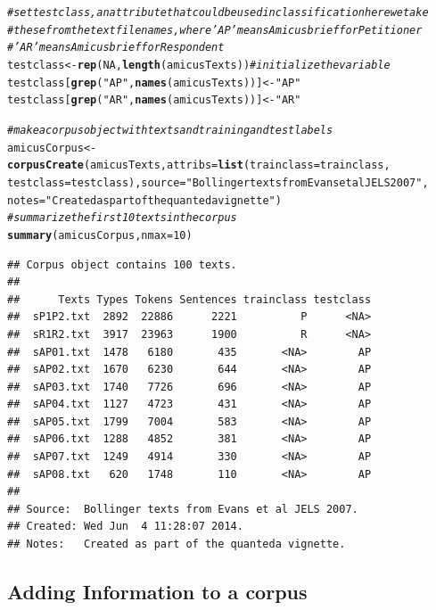 \documentclass[11pt]{article}\usepackage[]{graphicx}\usepackage[]{color}
\makeatletter
\newcommand{\hlnum}[1]{\textcolor[rgb]{0.686,0.059,0.569}{#1}}%
\newcommand{\hlstr}[1]{\textcolor[rgb]{0.192,0.494,0.8}{#1}}%
\newcommand{\hlcom}[1]{\textcolor[rgb]{0.678,0.584,0.686}{\textit{#1}}}%
\newcommand{\hlstd}[1]{\textcolor[rgb]{0.345,0.345,0.345}{#1}}%
\newcommand{\hlkwb}[1]{\textcolor[rgb]{0.69,0.353,0.396}{#1}}%
\newcommand{\hlkwc}[1]{\textcolor[rgb]{0.333,0.667,0.333}{#1}}%
\newcommand{\hlkwd}[1]{\textcolor[rgb]{0.737,0.353,0.396}{\textbf{#1}}}%
\newenvironment{kframe}{%
 \def\at@end@of@kframe{}%
 \ifinner\ifhmode%
  \def\at@end@of@kframe{\end{minipage}}%
  \begin{minipage}{\columnwidth}%
 \fi\fi%
 \def\FrameCommand##1{\hskip\@totalleftmargin \hskip-\fboxsep
 \colorbox{shadecolor}{##1}\hskip-\fboxsep
     \hskip-\linewidth \hskip-\@totalleftmargin \hskip\columnwidth}%
 \MakeFramed {\advance\hsize-\width
   \@totalleftmargin\z@ \linewidth\hsize
   \@setminipage}}%
 {\par\unskip\endMakeFramed%
 \at@end@of@kframe}
\newenvironment{knitrout}{}{} %
\makeatother
\begin{document}
\begin{knitrout}
\begin{kframe}
\begin{alltt}
\hlcom{# set test class, an attribute that could be used in classification here we take}
\hlcom{# these from the text filenames, where 'AP' means Amicus brief for Petitioner}
\hlcom{# 'AR' means Amicus brief for Respondent}
\hlstd{testclass} \hlkwb{<-} \hlkwd{rep}\hlstd{(}\hlnum{NA}\hlstd{,} \hlkwd{length}\hlstd{(amicusTexts))}  \hlcom{# initialize the variable}
\hlstd{testclass[}\hlkwd{grep}\hlstd{(}\hlstr{"AP"}\hlstd{,} \hlkwd{names}\hlstd{(amicusTexts))]} \hlkwb{<-} \hlstr{"AP"}
\hlstd{testclass[}\hlkwd{grep}\hlstd{(}\hlstr{"AR"}\hlstd{,} \hlkwd{names}\hlstd{(amicusTexts))]} \hlkwb{<-} \hlstr{"AR"}

\hlcom{# make a corpus object with texts and training and test labels}
\hlstd{amicusCorpus} \hlkwb{<-} \hlkwd{corpusCreate}\hlstd{(amicusTexts,} \hlkwc{attribs} \hlstd{=} \hlkwd{list}\hlstd{(}\hlkwc{trainclass} \hlstd{= trainclass,}
    \hlkwc{testclass} \hlstd{= testclass),} \hlkwc{source} \hlstd{=} \hlstr{"Bollinger texts from Evans et al JELS 2007"}\hlstd{,}
    \hlkwc{notes} \hlstd{=} \hlstr{"Created as part of the quanteda vignette"}\hlstd{)}
\hlcom{# summarize the first 10 texts in the corpus}
\hlkwd{summary}\hlstd{(amicusCorpus,} \hlkwc{nmax} \hlstd{=} \hlnum{10}\hlstd{)}
\end{alltt}
\begin{verbatim}
## Corpus object contains 100 texts.
## 
##      Texts Types Tokens Sentences trainclass testclass
##  sP1P2.txt  2892  22886      2221          P      <NA>
##  sR1R2.txt  3917  23963      1900          R      <NA>
##  sAP01.txt  1478   6180       435       <NA>        AP
##  sAP02.txt  1670   6230       644       <NA>        AP
##  sAP03.txt  1740   7726       696       <NA>        AP
##  sAP04.txt  1127   4723       431       <NA>        AP
##  sAP05.txt  1799   7004       583       <NA>        AP
##  sAP06.txt  1288   4852       381       <NA>        AP
##  sAP07.txt  1249   4914       330       <NA>        AP
##  sAP08.txt   620   1748       110       <NA>        AP
## 
## Source:  Bollinger texts from Evans et al JELS 2007.
## Created: Wed Jun  4 11:28:07 2014.
## Notes:   Created as part of the quanteda vignette.
\end{verbatim}
\end{kframe}
\end{knitrout}


\subsection{Adding Information to a corpus}
\end{document}

